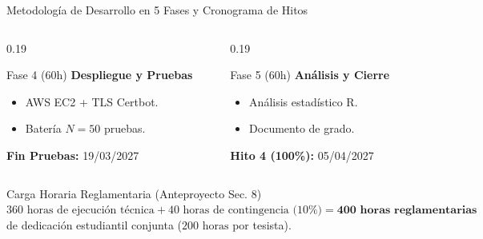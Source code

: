 \documentclass[aspectratio=169, 10pt]{beamer}
\begin{document}
\begin{frame}{Metodología de Desarrollo en 5 Fases y Cronograma de Hitos}
\begin{columns}[t]
\begin{column}{0.19\textwidth}
\begin{block}{\centering Fase 4 (60h)}
        \scriptsize
        \textbf{Despliegue y Pruebas}
        \begin{itemize}\setlength{\itemsep}{1pt}
          \item AWS EC2 + TLS Certbot.
          \item Batería $N=50$ pruebas.
        \end{itemize}
        \vspace{2pt}
        \textbf{Fin Pruebas:} 19/03/2027
      \end{block}
    \end{column}
    \begin{column}{0.19\textwidth}
      \begin{block}{\centering Fase 5 (60h)}
        \scriptsize
        \textbf{Análisis y Cierre}
        \begin{itemize}\setlength{\itemsep}{1pt}
          \item Análisis estadístico R.
          \item Documento de grado.
        \end{itemize}
        \vspace{2pt}
        \textbf{Hito 4 (100\%):} 05/04/2027
      \end{block}
    \end{column}
  \end{columns}
  
  \vspace{0.3cm}
  \begin{exampleblock}{Carga Horaria Reglamentaria (Anteproyecto Sec. 8)}
    \footnotesize
    $360\text{ horas de ejecución técnica} + 40\text{ horas de contingencia (10\%)} = \mathbf{400\text{ horas reglamentarias}}$ de dedicación estudiantil conjunta ($200\text{ horas}$ por tesista).
  \end{exampleblock}
\end{frame}
\end{document}
